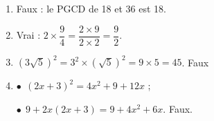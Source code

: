 
\medskip

%
 
\begin{enumerate}
\item %
Faux : le PGCD de 18 et 36 est 18. 
\item %
Vrai : $2 \times \dfrac{9}{4} =  \dfrac{2 \times 9 }{2 \times 2} = \dfrac{9}{2}$.
\item %
$\left(3\sqrt{5} \right)^2 = 3^2 \times \left(\sqrt{5} \right)^2 = 9 \times 5 = 45$. Faux
\item %
$\bullet~~$$(2x + 3)^2 = 4x^2 + 9 + 12x$ ;

$\bullet~~$$9 + 2x(2x + 3) = 9 + 4x^2 + 6x$. Faux.
\end{enumerate}

\bigskip

